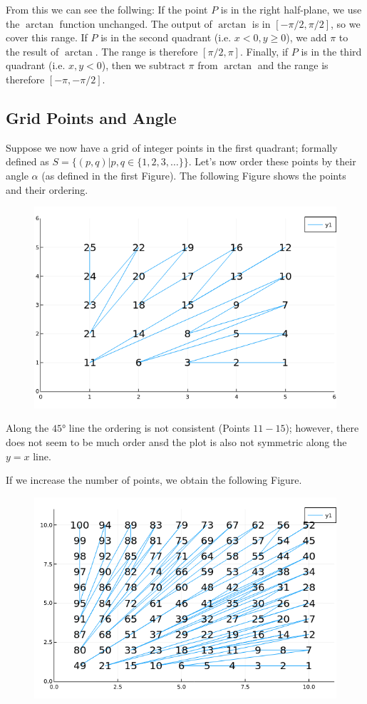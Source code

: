 From this we can see the follwing: If the point $P$ is in the right half-plane, we use the $\arctan$ function unchanged. The output of $\arctan$ is in $[-\pi/2, \pi/2]$, so we cover this range. If $P$ is in the second quadrant (i.e. $x < 0, y \geq 0$), we add $\pi$ to the result of $\arctan$. The range is therefore $[\pi/2, \pi]$. Finally, if $P$ is in the third quadrant (i.e. $x, y < 0$), then we subtract $\pi$ from $\arctan$ and the range is therefore $[-\pi, -\pi/2]$.


\subsection{Grid Points and Angle}

Suppose we now have a grid of integer points in the first quadrant; formally defined as $S = \{ (p,q) | p,q \in \{1,2,3,\ldots\} \}$. Let's now order these points by their angle $\alpha$ (as defined in the first Figure). The following Figure shows the points and their ordering.


\begin{figure}[H]
\centering
\includegraphics[scale=0.5]{images/AoC_2019_10_03.png}
\end{figure}

Along the $45°$ line the ordering is not consistent (Points $11 - 15$); however, there does not seem to be much order ansd the plot is also not symmetric along the $y = x$ line.

If we increase the number of points, we obtain the following Figure.

\begin{figure}[H]
\centering
\includegraphics[scale=0.5]{images/AoC_2019_10_04.png}
\end{figure}



